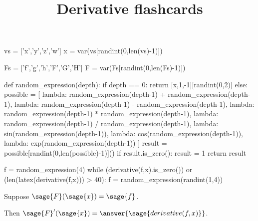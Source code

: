\documentclass{ximera}
\title{Derivative flashcards}
\begin{document}
\begin{sagesilent}
  vs = ['x','y','z','w']
  x = var(vs[randint(0,len(vs)-1)])

  Fs = ['f','g','h','F','G','H']
  F = var(Fs[randint(0,len(Fs)-1)])
  
  def random_expression(depth):
    if depth == 0:
      return [x,1,-1][randint(0,2)]
    else:
      possible = [
        lambda: random_expression(depth-1) + random_expression(depth-1),
        lambda: random_expression(depth-1) - random_expression(depth-1),
        lambda: random_expression(depth-1) * random_expression(depth-1),
        lambda: random_expression(depth-1) / random_expression(depth-1),
        lambda: sin(random_expression(depth-1)),
        lambda: cos(random_expression(depth-1)),
        lambda: exp(random_expression(depth-1))
      ]
      result = possible[randint(0,len(possible)-1)]()
      if result.is_zero():
        result = 1
      return result

  f = random_expression(4)
  while (derivative(f,x).is_zero()) or (len(latex(derivative(f,x))) > 40):
    f = random_expression(randint(1,4))
\end{sagesilent}

\begin{exercise}

  Suppose $\sage{F}(\sage{x}) = \sage{f}$.

  Then $\sage{F}'(\sage{x}) = \answer{\sage{derivative(f,x)}}$.

\end{exercise}
\end{document}
